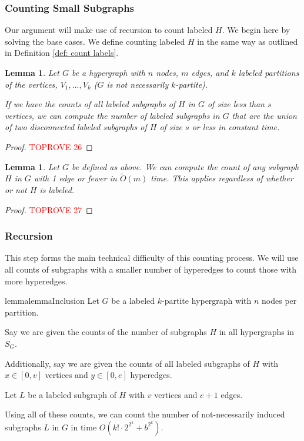 \documentclass[11pt,letterpaper,pdftex]{article}
\newtheorem{lemma}[theorem]{Lemma}
\def\Otil{\tilde{O}}
\begin{document}
\subsubsection{Counting Small Subgraphs}
Our argument will make use of recursion to count labeled $H$. We begin here by solving the base cases. We define counting labeled $H$ in the same way as outlined in 
Definition \ref{def: count labels}.

\begin{lemma}\label{lem: disconnected count}
Let $G$ be a hypergraph with $n$ nodes, $m$ edges, and $k$ labeled partitions of the vertices, $V_1,...,V_k$ ($G$ is not necessarily $k$-partite).

If we have the counts of all labeled subgraphs of $H$ in $G$ of size less than $s$ vertices, we can compute the number of labeled subgraphs in $G$ that are the union of two disconnected labeled subgraphs of $H$ of size $s$ or less in constant time.
\end{lemma}

\begin{proof}\textcolor{red}{TOPROVE 26}\end{proof}

\begin{lemma}\label{lem: tiny count}
Let $G$ be defined as above. We can compute the count of any subgraph $H$ in $G$ with 1 edge or fewer in $\Otil(m)$ time. This applies regardless of whether or not $H$ is labeled.
\end{lemma}

\begin{proof}\textcolor{red}{TOPROVE 27}\end{proof}

\subsubsection{Recursion}

This step forms the main technical difficulty of this counting process. We will use all counts of subgraphs with a smaller number of hyperedges to count those with more hyperedges.

\begin{restatable}{lemma}{lemmaInclusion}\label{lem: inclusion}
Let $G$ be a labeled $k$-partite hypergraph with $n$ nodes per partition.

Say we are given the counts of the number of subgraphs $H$ in all hypergraphs in $S_G$.

Additionally, say we are given the counts of all labeled subgraphs of $H$ with $x\in [0,v]$ vertices and $y\in [0,e]$ hyperedges.

Let $L$ be a labeled subgraph of $H$ with $v$ vertices and $e+1$ edges.

Using all of these counts, we can count the number of not-necessarily induced subgraphs $L$ in $G$ in time $O(k!\cdot 2^{2^k} + b^{2^k})$.
\end{restatable}
\end{document}
